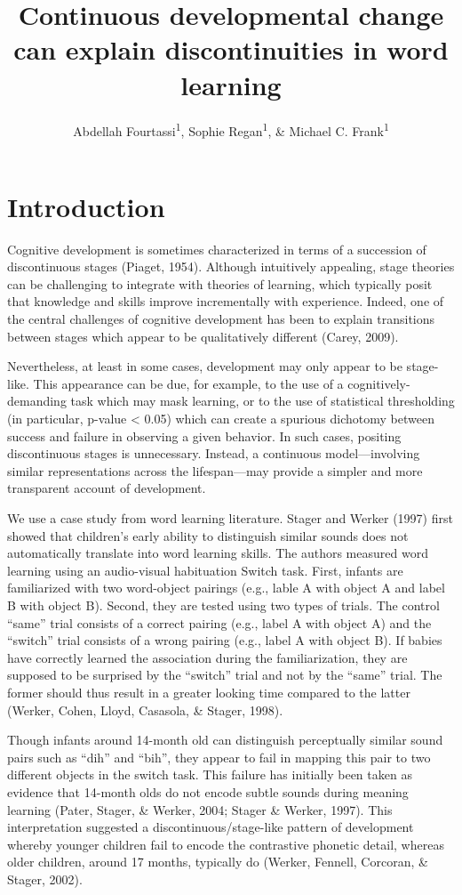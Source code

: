 \documentclass[english,,man,floatsintext]{apa6}
\title{Continuous developmental change can explain discontinuities in word
learning}
\author{Abdellah Fourtassi\textsuperscript{1}, Sophie Regan\textsuperscript{1},
\& Michael C. Frank\textsuperscript{1}}
\date{}
\affiliation{
\vspace{0.5cm}
\textsuperscript{1} Department of Psychology, Stanford University}
\theoremstyle{definition}
\theoremstyle{definition}
\theoremstyle{definition}
\theoremstyle{remark}
\begin{document}
\maketitle

\section{Introduction}\label{introduction}

Cognitive development is sometimes characterized in terms of a
succession of discontinuous stages (Piaget, 1954). Although intuitively
appealing, stage theories can be challenging to integrate with theories
of learning, which typically posit that knowledge and skills improve
incrementally with experience. Indeed, one of the central challenges of
cognitive development has been to explain transitions between stages
which appear to be qualitatively different (Carey, 2009).

Nevertheless, at least in some cases, development may only appear to be
stage-like. This appearance can be due, for example, to the use of a
cognitively-demanding task which may mask learning, or to the use of
statistical thresholding (in particular, p-value \textless{} 0.05) which
can create a spurious dichotomy between success and failure in observing
a given behavior. In such cases, positing discontinuous stages is
unnecessary. Instead, a continuous model---involving similar
representations across the lifespan---may provide a simpler and more
transparent account of development.

We use a case study from word learning literature. Stager and Werker
(1997) first showed that children's early ability to distinguish similar
sounds does not automatically translate into word learning skills. The
authors measured word learning using an audio-visual habituation Switch
task. First, infants are familiarized with two word-object pairings
(e.g., lable A with object A and label B with object B). Second, they
are tested using two types of trials. The control \enquote{same} trial
consists of a correct pairing (e.g., label A with object A) and the
\enquote{switch} trial consists of a wrong pairing (e.g., label A with
object B). If babies have correctly learned the association during the
familiarization, they are supposed to be surprised by the
\enquote{switch} trial and not by the \enquote{same} trial. The former
should thus result in a greater looking time compared to the latter
(Werker, Cohen, Lloyd, Casasola, \& Stager, 1998).

Though infants around 14-month old can distinguish perceptually similar
sound pairs such as \enquote{dih} and \enquote{bih}, they appear to fail
in mapping this pair to two different objects in the switch task. This
failure has initially been taken as evidence that 14-month olds do not
encode subtle sounds during meaning learning (Pater, Stager, \& Werker,
2004; Stager \& Werker, 1997). This interpretation suggested a
discontinuous/stage-like pattern of development whereby younger children
fail to encode the contrastive phonetic detail, whereas older children,
around 17 months, typically do (Werker, Fennell, Corcoran, \& Stager,
2002).
\end{document}
